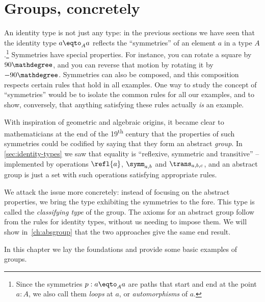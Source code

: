 \chapter{Groups, concretely}
\label{ch:groups}


An identity type is not just any type:  in the previous sections we have seen that the identity type $a\eqto_Aa$ reflects the ``symmetries'' of an element $a$ in a type $A$.\footnote{%
  Since the symmetries $p : a\eqto_A a$ are paths that start and end
  at the point $a:A$, we also call them \emph{loops} at $a$,
  or \emph{automorphisms} of $a$.\par
  }
Symmetries have special properties.  For instance, you can rotate a square by $90\mathdegree$, and you can reverse that motion by rotating it by $-90\mathdegree$.
Symmetries can also be composed, and this composition respects certain rules that hold in all examples.  One way to study the concept of ``symmetries'' would be to isolate the common rules for all our examples, and to show, conversely, that anything satisfying these rules actually \emph{is} an example.



With inspiration of geometric and algebraic origins, it became clear to mathematicians at the end of the 19\textsuperscript{th} century that the properties of such symmetries could be codified by saying that they form an abstract \emph{group}.
In \cref{sec:identity-types} we saw that equality is ``reflexive, symmetric 
and transitive'' -- implemented by operations $\refl{a}$, $\symm_{a,b}$ 
and $\trans_{a,b,c}$, and an abstract group is just a set with such 
operations satisfying appropriate rules.

We attack the issue more concretely:
instead of focusing on the abstract properties,
we bring the type exhibiting the symmetries to the fore.
This type is called the \emph{classifying type} of the group.
The axioms for an abstract group follow from the rules for identity types,
without us needing to impose them.
We will show in~\cref{ch:absgroup} that the two approaches give the same end result.

In this chapter we lay the foundations and provide some basic examples of groups.

